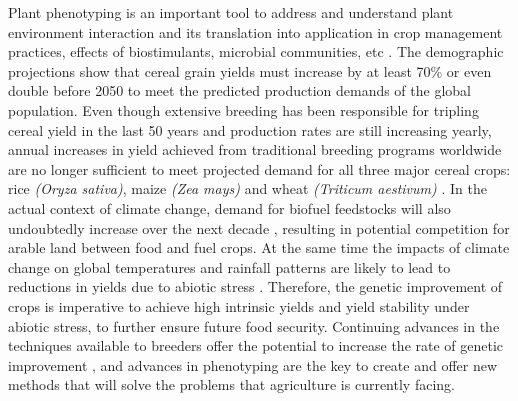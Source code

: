Plant phenotyping is an important tool to address and understand plant environment interaction and its translation into application in crop management practices, effects of biostimulants, microbial communities, etc \parencite{pieruschka2019plant}. 
The demographic projections show that cereal grain yields must increase by at least 70\% \parencite{furbank2009c4} or even double \parencite{tilman2011global} before 2050 to meet the predicted
production demands of the global population. Even though extensive breeding has been responsible for tripling cereal yield in the last 50 years \parencite{pingali2012green} and production rates are still increasing yearly, annual increases in yield achieved from traditional breeding programs worldwide are no longer sufficient to meet projected demand for all three major cereal crops: rice \textit{(Oryza sativa)}, maize \textit{(Zea mays)} and wheat \textit{(Triticum aestivum)} \parencite{tester2010breeding}.
 In the actual context of climate change, demand for biofuel feedstocks will also undoubtedly increase over the next decade \parencite{sticklen2007feedstock}, resulting in potential
competition for arable land between food and fuel crops. At
the same time the impacts of climate change on global
temperatures and rainfall patterns are likely to lead to
reductions in yields due to abiotic stress \parencite{tester2010breeding}. Therefore, the genetic improvement of crops is imperative to achieve high intrinsic yields and yield stability under abiotic stress, to further ensure future food security. Continuing advances in
the techniques available to breeders offer the potential to
increase the rate of genetic improvement \parencite{phillips2010mobilizing}, and advances in phenotyping are the key to create and offer new methods that will solve the problems that agriculture is currently facing.\\

